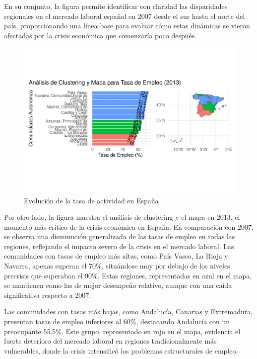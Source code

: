 \documentclass[Universitat de
València,article,submit,moreauthors,pdftex]{Definitions/mdpi}
\begin{document}
En su conjunto, la figura permite identificar con claridad las
disparidades regionales en el mercado laboral español en 2007 desde el
sur hasta el norte del país, proporcionando una línea base para evaluar
cómo estas dinámicas se vieron afectadas por la crisis económica que
comenzaría poco después.

\begin{figure}[h]

{\centering \includegraphics[width=1\linewidth]{ProyectoAED2024_files/figure-latex/unnamed-chunk-36-1} 

}

\caption{Evolución de la tasa de actividad en España}\label{fig:unnamed-chunk-36}
\end{figure}

Por otro lado, la figura muestra el análisis de clustering y el mapa en
2013, el momento más crítico de la crisis económica en España. En
comparación con 2007, se observa una disminución generalizada de las
tasas de empleo en todas las regiones, reflejando el impacto severo de
la crisis en el mercado laboral. Las comunidades con tasas de empleo más
altas, como País Vasco, La Rioja y Navarra, apenas superan el 70\%,
situándose muy por debajo de los niveles precrisis que superaban el
90\%. Estas regiones, representadas en azul en el mapa, se mantienen
como las de mejor desempeño relativo, aunque con una caída significativa
respecto a 2007.

Las comunidades con tasas más bajas, como Andalucía, Canarias y
Extremadura, presentan tasas de empleo inferiores al 60\%, destacando
Andalucía con un preocupante 55.5\%. Este grupo, representado en rojo en
el mapa, evidencia el fuerte deterioro del mercado laboral en regiones
tradicionalmente más vulnerables, donde la crisis intensificó los
problemas estructurales de empleo.
\end{document}

